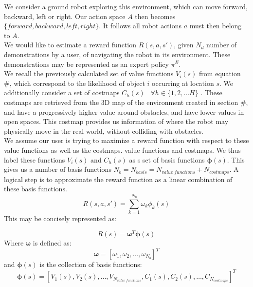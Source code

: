 We consider a ground robot exploring this environment, which can move forward, backward, left or right. Our action space $A$ then becomes $\{forward,backward,left,right\}$. It follows all robot actions $a$ must then belong to $A$. \\


We would like to estimate a reward function $R(s,a,s')$, given $N_d$ number of demonstrations by a user, of navigating the robot in its environment. These demonstrations may be represented as an expert policy $\pi^E$.\\

We recall the previously calculated set of value functions $V_i(s)$ from equation \#, which correspond to the likelihood of object $i$ occurring at location $s$. We additionally consider a set of costmaps $C_h(s) \;\;\; \forall h \in \{1,2,...H\}$ . These costmaps are retrieved from the 3D map of the environment created in section \#, and have a progressively higher value around obstacles, and have lower values in open spaces. This costmap provides us information of where the robot may physically move in the real world, without colliding with obstacles.\\ 

We assume our user is trying to maximize a reward function with respect to these value functions as well as the costmaps. value functions and costmaps. We thus label these functions $V_i(s)$ and $C_h(s)$ as s set of basis functions $\bm{\phi}(s)$. This gives us a number of basis functions $N_b = N_{basis} = N_{value \; functions} + N_{costmaps}$. A  logical step is to approximate the reward function as a linear combination of these basis functions. 
\begin{equation}
R(s,a,s') = \sum_{k=1}^{N_{b}} \omega_k \phi_k(s)
\end{equation}
This may be concisely represented as: 

\begin{equation}
R(s) = \bm{\omega}^T \bm{\phi}(s)
\end{equation}
Where $\bm{\omega}$ is defined as: $$ \bm{\omega} = [ \omega_1, \omega_2, \dots, \omega_{N_b}]^T$$
and $\bm{\phi}(s)$ is the collection of basis functions: $$\bm{\phi}(s) = [ V_1(s), V_2(s), \dots, V_{N_{value \; functions}}, C_1(s), C_2(s), \dots, C_{N_{costmaps}}]^T$$

